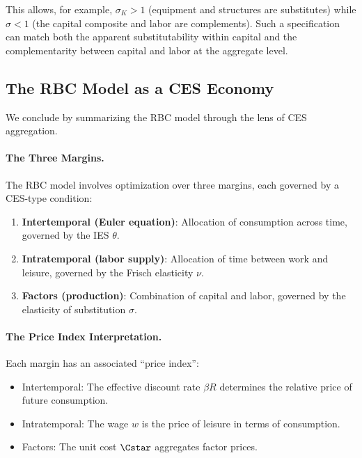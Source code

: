 This allows, for example, $\sigma_K > 1$ (equipment and structures are substitutes) while $\sigma < 1$ (the capital composite and labor are complements). Such a specification can match both the apparent substitutability within capital and the complementarity between capital and labor at the aggregate level.

\subsection{The RBC Model as a CES Economy}
\label{subsec:rbc-ces-summary}

We conclude by summarizing the RBC model through the lens of CES aggregation.

\paragraph{The Three Margins.}
The RBC model involves optimization over three margins, each governed by a CES-type condition:

\begin{enumerate}[nosep]
\item \textbf{Intertemporal (Euler equation)}: Allocation of consumption across time, governed by the IES $\theta$.
\item \textbf{Intratemporal (labor supply)}: Allocation of time between work and leisure, governed by the Frisch elasticity $\nu$.
\item \textbf{Factors (production)}: Combination of capital and labor, governed by the elasticity of substitution $\sigma$.
\end{enumerate}

\paragraph{The Price Index Interpretation.}
Each margin has an associated ``price index'':
\begin{itemize}[nosep]
\item Intertemporal: The effective discount rate $\beta R$ determines the relative price of future consumption.
\item Intratemporal: The wage $w$ is the price of leisure in terms of consumption.
\item Factors: The unit cost $\Cstar$ aggregates factor prices.
\end{itemize}

